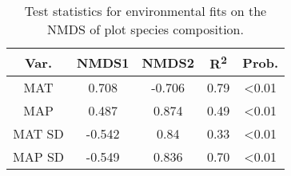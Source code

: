 
\begin{table}[!htbp] \centering 
  \caption{Test statistics for environmental fits on the NMDS of plot species composition.} 
  \label{bicuar:nmds_envfit} 
\begin{tabular}{ccccc} 
	\hline
{Var.} & {NMDS1} & {NMDS2} & {R\textsuperscript{2}} & {Prob.} \\
	\hline
MAT & 0.708 & -0.706 & 0.79 & \textless 0.01 \\ 
MAP & 0.487 & 0.874 & 0.49 & \textless 0.01 \\ 
MAT SD & -0.542 & 0.84 & 0.33 & \textless 0.01 \\ 
MAP SD & -0.549 & 0.836 & 0.70 & \textless 0.01 \\ 
	\hline
\end{tabular} 
\end{table} 
